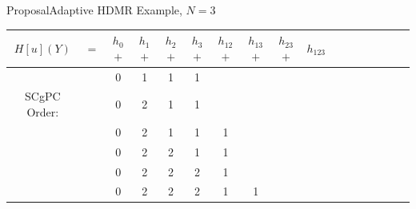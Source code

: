 \documentclass{beamer}
\begin{document}
\begin{frame}{Proposal}{Adaptive HDMR}\vspace{-20pt}
  Example, $N=3$
\begin{table}[h!]\footnotesize
\centering
\begin{tabular}{c c c c c c c c c c c c c c c c c}
    $H[u](Y)$ &$=$ &$h_0$ $+$ &$h_1$ $+$ &$h_2$ $+$ &$h_3$ $+$ &$h_{12}$ $+$ &$h_{13}$ $+$ &$h_{23}$ $+$
    &$h_{123}$ \\\hline
              &    & 0        & 1        & 1        & 1        &             &             &             & \\     
SCgPC Order:  &    & 0        & 2        & 1        & 1        &             &             &             & \\     
              &    & 0        & 2        & 1        & 1        & 1           &             &             & \\     
              &    & 0        & 2        & 2        & 1        & 1           &             &             & \\     
              &    & 0        & 2        & 2        & 2        & 1           &             &             & \\     
              &    & 0        & 2        & 2        & 2        & 1           & 1           &             &      
\end{tabular}
\end{table}
\end{frame}
\end{document}
